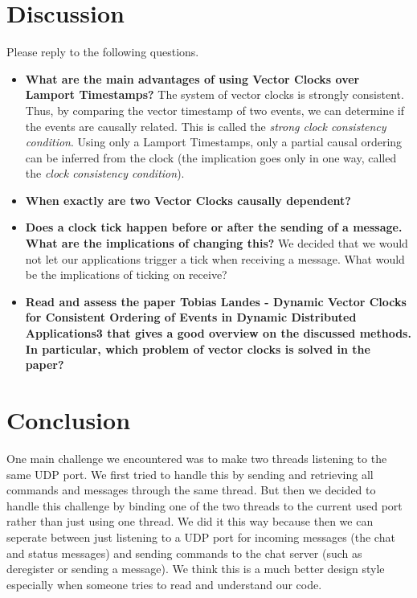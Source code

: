 \documentclass{report}
\begin{document}
\section{Discussion}
Please reply to the following questions.
\begin{itemize}
  \item \textbf{What are the main advantages of using Vector Clocks over Lamport Timestamps?} The system of vector clocks is strongly consistent. Thus, by comparing the vector timestamp of two events, we can determine if the events are causally related. This is called the \textit{strong clock consistency condition}. Using only a Lamport Timestamps, only a partial causal ordering can be inferred from the clock (the implication goes only in one way, called the \textit{clock consistency condition}).
  \item \textbf{When exactly are two Vector Clocks causally dependent?}
  \item \textbf{Does a clock tick happen before or after the sending of a message. What are the implications of changing this?} We decided that we would not let our applications trigger a tick when receiving a message. What would be the implications of ticking on receive?
  \item \textbf{Read and assess the paper Tobias Landes - Dynamic Vector Clocks for Consistent Ordering of Events in Dynamic Distributed Applications3 that gives a good overview on the discussed methods. In particular, which problem of vector clocks is solved in the paper?}
\end{itemize}


\section{Conclusion}

One main challenge we encountered was to make two threads listening to the same UDP port. We first tried to handle this by sending and retrieving all commands and messages through the same thread. But then we decided to handle this challenge by binding one of the two threads to the current used port rather than just using one thread. We did it this way because then we can seperate between just listening to a UDP port for incoming messages (the chat and status messages) and sending commands to the chat server (such as deregister or sending a message). We think this is a much better design style especially when someone tries to read and understand our code.
\end{document}
